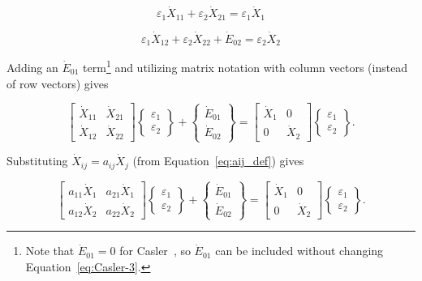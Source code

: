 \begin{equation} \label{eq:Casler-3}
	\varepsilon_{1} \dot{X}_{11}
	+ \varepsilon_{2} \dot{X}_{21}
	= \varepsilon_{1} \dot{X}_{1}
\end{equation}

\begin{equation} \label{eq:Casler-4}
	\varepsilon_{1} \dot{X}_{12}
	+ \varepsilon_{2} \dot{X}_{22}
	+ \dot{E}_{02}
	= \varepsilon_{2} \dot{X}_{2}
\end{equation}

\noindent{}Adding an $\dot{E}_{01}$ term\footnote{Note that 
$\dot{E}_{01} = 0$ for Casler~\cite{Casler1984}, 
so $\dot{E}_{01}$ can be included without changing Equation~\ref{eq:Casler-3}.} 
and utilizing matrix notation with column vectors 
(instead of row vectors) gives

\begin{equation} \label{eq:Casler34-matrix}
	\begin{bmatrix}
		\dot{X}_{11} & \dot{X}_{21} \\
		\dot{X}_{12} & \dot{X}_{22}
	\end{bmatrix}
	\begin{Bmatrix}
		\varepsilon_{1} \\
		\varepsilon_{2}
	\end{Bmatrix}
	+
	\begin{Bmatrix}
		\dot{E}_{01} \\
		\dot{E}_{02}
	\end{Bmatrix}
	=
	\begin{bmatrix}
		\dot{X}_{1} & 0 \\
		0           & \dot{X}_{2}
	\end{bmatrix}
	\begin{Bmatrix}
		\varepsilon_{1} \\
		\varepsilon_{2}
	\end{Bmatrix}.
\end{equation}

\noindent{}Substituting $\dot{X}_{ij} = a_{ij} \dot{X}_{j}$ (from 
Equation~\ref{eq:aij_def}) gives

\begin{equation} \label{eq:Casler34-matrix-with-a}
	\begin{bmatrix}
		a_{11} \dot{X}_{1} & a_{21} \dot{X}_{1} \\
		a_{12} \dot{X}_{2} & a_{22} \dot{X}_{2}
	\end{bmatrix}
	\begin{Bmatrix}
		\varepsilon_{1} \\
		\varepsilon_{2}
	\end{Bmatrix}
	+
	\begin{Bmatrix}
		\dot{E}_{01} \\
		\dot{E}_{02}
	\end{Bmatrix}
	=
	\begin{bmatrix}
		\dot{X}_{1} & 0 \\
		0           & \dot{X}_{2}
	\end{bmatrix}
	\begin{Bmatrix}
		\varepsilon_{1} \\
		\varepsilon_{2}
	\end{Bmatrix}.
\end{equation}

